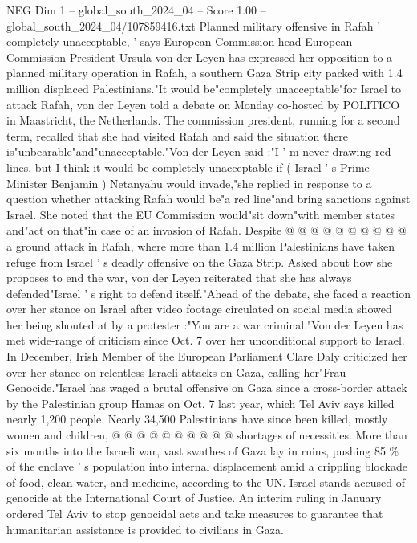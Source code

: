 \begin{textsample}{NEG Dim 1 – global\_south\_2024\_04 – Score 1.00 – global\_south\_2024\_04/107859416.txt}  \label{ex:f1_neg_413}
Planned military offensive in Rafah ' completely unacceptable, ' says European Commission head European Commission President Ursula von der Leyen has expressed her opposition to a planned military operation in Rafah, a southern Gaza Strip city packed with 1.4 million displaced Palestinians."It would be"completely unacceptable"for Israel to attack Rafah, von der Leyen told a debate on Monday co-hosted by POLITICO in Maastricht, the Netherlands.
The commission president, running for a second term, recalled that she had visited Rafah and said the situation there is"unbearable"and"unacceptable."Von der Leyen said :"I ' m never drawing red lines, but I think it would be completely unacceptable if ( Israel ' s Prime Minister Benjamin ) Netanyahu would invade,"she replied in response to a question whether attacking Rafah would be"a red line"and bring sanctions against Israel.
She noted that the EU Commission would"sit down"with member states and"act on that"in case of an invasion of Rafah.
Despite @ @ @ @ @ @ @ @ @ @ a ground attack in Rafah, where more than 1.4 million Palestinians have taken refuge from Israel ' s deadly offensive on the Gaza Strip.
Asked about how she proposes to end the war, von der Leyen reiterated that she has always defended"Israel ' s right to defend itself."Ahead of the debate, she faced a reaction over her stance on Israel after video footage circulated on social media showed her being shouted at by a protester :"You are a war criminal."Von der Leyen has met wide-range of criticism since Oct. 7 over her unconditional support to Israel.
In December, Irish Member of the European Parliament Clare Daly criticized her over her stance on relentless Israeli attacks on Gaza, calling her"Frau Genocide."Israel has waged a brutal offensive on Gaza since a cross-border attack by the Palestinian group Hamas on Oct. 7 last year, which Tel Aviv says killed nearly 1,200 people.
Nearly 34,500 Palestinians have since been killed, mostly women and children, @ @ @ @ @ @ @ @ @ @ shortages of necessities.
More than six months into the Israeli war, vast swathes of Gaza lay in ruins, pushing 85 \% of the enclave ' s population into internal displacement amid a crippling blockade of food, clean water, and medicine, according to the UN.
Israel stands accused of genocide at the International Court of Justice.
An interim ruling in January ordered Tel Aviv to stop genocidal acts and take measures to guarantee that humanitarian assistance is provided to civilians in Gaza.

\end{textsample}
